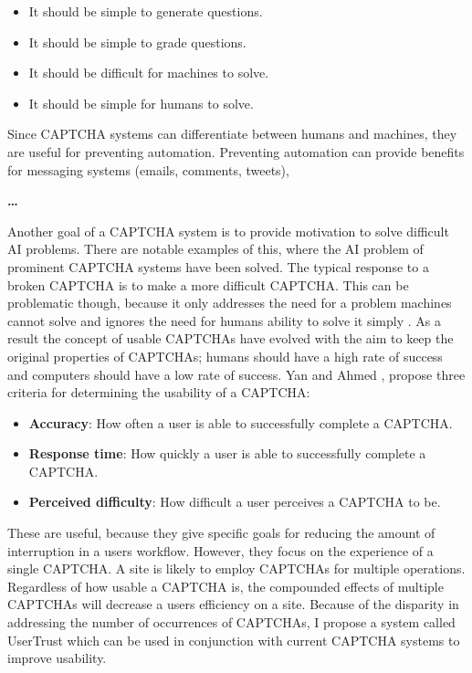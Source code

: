 \documentclass[journal, 12pt, onecolumn, draftclsnofoot]{IEEEtran}
\begin{document}
\begin{itemize}
  \item It should be simple to generate questions.
  \item It should be simple to grade questions.
  \item It should be difficult for machines to solve.
  \item It should be simple for humans to solve.
\end{itemize}

Since CAPTCHA systems can differentiate between humans and machines, they are useful for preventing automation. Preventing automation can provide benefits for messaging systems (emails, comments, tweets),

\textbf{\ldots}

Another goal of a CAPTCHA system is to provide motivation to solve difficult AI problems. There are notable examples \cite{yahoo-captcha, microsoft-captcha, yan2} of this, where the AI problem of prominent CAPTCHA systems have been solved. The typical response \cite{ince, srikanth} to a broken CAPTCHA is to make a more difficult CAPTCHA. This can be problematic though, because it only addresses the need for a problem machines cannot solve and ignores the need for humans ability to solve it simply \cite{jakobsson}. As a result the concept of usable CAPTCHAs \cite{yan, kluever, yamamoto, yamamoto2} have evolved with the aim to keep the original properties of CAPTCHAs; humans should have a high rate of success and computers should have a low rate of success. Yan and Ahmed \cite{yan}, propose three criteria for determining the usability of a CAPTCHA:

\begin{itemize}
  \item \textbf{Accuracy}: How often a user is able to successfully complete a CAPTCHA.
  \item \textbf{Response time}: How quickly a user is able to successfully complete a CAPTCHA.
  \item \textbf{Perceived difficulty}: How difficult a user perceives a CAPTCHA to be.
\end{itemize}

These are useful, because they give specific goals for reducing the amount of interruption in a users workflow. However, they focus on the experience of a single CAPTCHA. A site is likely to employ CAPTCHAs for multiple operations. Regardless of how usable a CAPTCHA is, the compounded effects of multiple CAPTCHAs will decrease a users efficiency on a site. Because of the disparity in addressing the number of occurrences of CAPTCHAs, I propose a system called UserTrust which can be used in conjunction with current CAPTCHA systems to improve usability.
\end{document}
